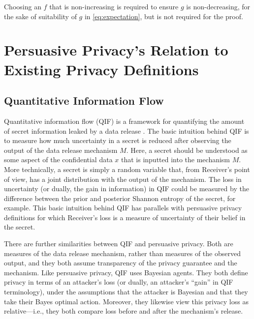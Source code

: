 \documentclass{article}
\theoremstyle{plain}
\theoremstyle{plain}
\theoremstyle{definition}
\theoremstyle{remark}
\theoremstyle{plain}
\begin{document}
\begin{remark}
   Choosing an $f$ that is non-increasing is required to ensure $g$ is non-decreasing, for the sake of suitability of $g$ in \eqref{eq:expectation}, but is not required for the proof. 
\end{remark}

\section{Persuasive Privacy's Relation to Existing Privacy Definitions}\label{app:relation}

\subsection{Quantitative Information Flow}\label{app:QIF}

Quantitative information flow (QIF) is a framework for quantifying the amount of secret information leaked by a data release \citep{alvimMeasuringInformationLeakage2012, alvimScienceQuantitativeInformation2020, smithFoundationsQuantitativeInformation2009}. The basic intuition behind QIF is to measure how much uncertainty in a secret is reduced after observing the output of the data release mechanism $M$.
Here, a secret should be understood as some aspect of the confidential data $x$ that is inputted into the mechanism $M$. More technically, a secret is simply a random variable that, from Receiver's point of view, has a joint distribution with the output of the mechanism. The loss in uncertainty (or dually, the gain in information) in QIF could be measured by the difference between the prior and posterior Shannon entropy of the secret, for example.
This basic intuition behind QIF has parallels with persuasive privacy definitions for which Receiver's loss is a measure of uncertainty of their belief in the secret.

There are further similarities between QIF and persuasive privacy. Both are measures of the data release mechanism, rather than measures of the observed output, and they both assume transparency of the privacy guarantee and the mechanism. Like persuasive privacy, QIF uses Bayesian agents. They both define privacy in terms of an attacker’s loss (or dually, an attacker's ``gain'' in QIF terminology), under the assumptions that the attacker is Bayesian and that they take their Bayes optimal action. Moreover, they likewise view this privacy loss as relative---i.e., they both compare loss before and after the mechanism’s release.
\end{document}

